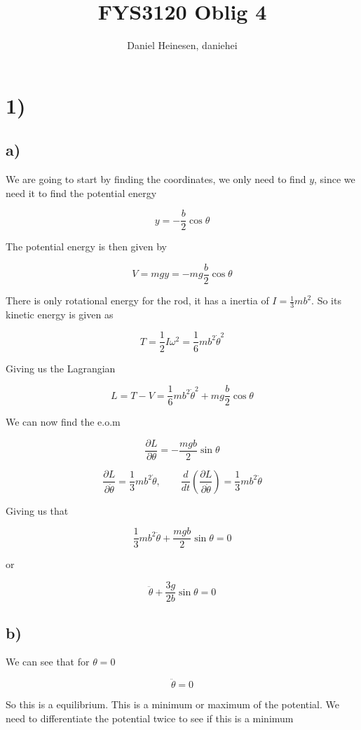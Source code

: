 \documentclass[a4paper,norsk, 10pt]{article}
\title{FYS3120 Oblig 4}
\author{Daniel Heinesen, daniehei}
\begin{document}
\maketitle

\section*{1)}
\subsection*{a)}

We are going to start by finding the coordinates, we only need to find $y$, since we need it to find the potential energy

$$
y = -\frac{b}{2}\cos\theta
$$

The potential energy is then given by

$$
V = mgy = -mg\frac{b}{2}\cos\theta
$$

There is only rotational energy for the rod, it has a inertia of $I = \frac{1}{3}mb^2$. So its kinetic energy is given as

$$
T = \frac{1}{2}I\omega^2 = \frac{1}{6}mb^2\dot{\theta}^2
$$

Giving us the Lagrangian

$$
L = T -V = \frac{1}{6}mb^2\dot{\theta}^2 +mg\frac{b}{2}\cos\theta
$$

We can now find the e.o.m

$$
\frac{\partial L}{\partial \theta} = -\frac{mgb}{2}\sin\theta
$$

$$
\frac{\partial L}{\partial \dot{\theta}} = \frac{1}{3}mb^2\dot{\theta}, \qquad \frac{d}{dt}\left(\frac{\partial L}{\partial \dot{\theta}} \right) = \frac{1}{3}mb^2\ddot{\theta}
$$

Giving us that

$$
\frac{1}{3}mb^2\ddot{\theta} +\frac{mgb}{2}\sin\theta = 0
$$

or

$$
\ddot{\theta} + \frac{3g}{2b}\sin\theta = 0
$$

\subsection*{b)}
We can see that for $\theta = 0$

$$
\ddot{\theta} = 0
$$


So this is a equilibrium. This is a minimum or maximum of the potential. We need to differentiate the potential twice to see if this is a minimum
\end{document}
